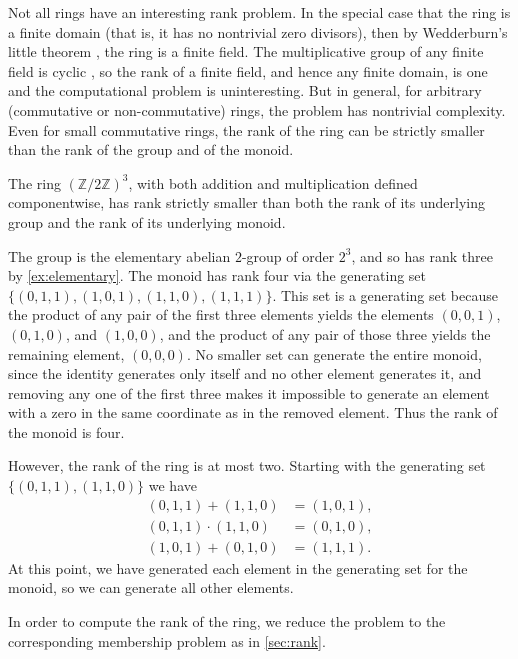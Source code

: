 Not all rings have an interesting rank problem.
In the special case that the ring is a finite domain (that is, it has no nontrivial zero divisors), then by Wedderburn's little theorem \autocite[Theorem~3~§~11.1]{nicholson12}, the ring is a finite field.
The multiplicative group of any finite field is cyclic \autocite[Theorem~7~§~6.4]{nicholson12}, so the rank of a finite field, and hence any finite domain, is one and the computational problem is uninteresting.
But in general, for arbitrary (commutative or non-commutative) rings, the problem has nontrivial complexity.
Even for small commutative rings, the rank of the ring can be strictly smaller than the rank of the group and of the monoid.

\begin{example}\label{ex:ringsmaller}
  The ring $(\mathbb{Z} / 2 \mathbb{Z})^3$, with both addition and multiplication defined componentwise, has rank strictly smaller than both the rank of its underlying group and the rank of its underlying monoid.

  The group is the elementary abelian $2$-group of order $2^3$, and so has rank three by \autoref{ex:elementary}.
  The monoid has rank four via the generating set $\{(0, 1, 1), (1, 0, 1), (1, 1, 0), (1, 1, 1)\}$.
  This set is a generating set because the product of any pair of the first three elements yields the elements $(0, 0, 1)$, $(0, 1, 0)$, and $(1, 0, 0)$, and the product of any pair of those three yields the remaining element, $(0, 0, 0)$.
  No smaller set can generate the entire monoid, since the identity generates only itself and no other element generates it, and removing any one of the first three makes it impossible to generate an element with a zero in the same coordinate as in the removed element.
  Thus the rank of the monoid is four.

  However, the rank of the ring is at most two.
  Starting with the generating set $\{(0, 1, 1), (1, 1, 0)\}$ we have
  \begin{align*}
    (0, 1, 1) + (1, 1, 0) &= (1, 0, 1), \\
    (0, 1, 1) \cdot (1, 1, 0) &= (0, 1, 0), \\
    (1, 0, 1) + (0, 1, 0) &= (1, 1, 1).
  \end{align*}
  At this point, we have generated each element in the generating set for the monoid, so we can generate all other elements.
\end{example}

In order to compute the rank of the ring, we reduce the problem to the corresponding membership problem as in \autoref{sec:rank}.

